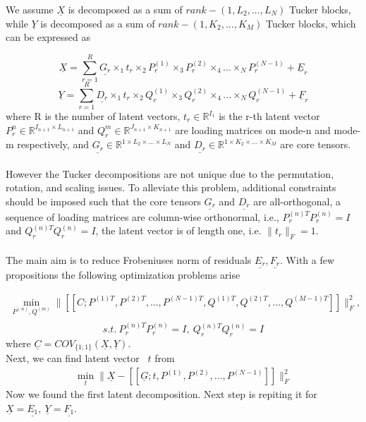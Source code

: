 \documentclass[../../main.tex]{subfiles}
\begin{document}
We assume $\underline{X}$ is decomposed as a sum of $rank-(1, L_2, . . . , L_N )$ Tucker blocks, while $\underline{Y}$ is decomposed as a sum of $rank-(1, K_2, . . . , K_M)$ Tucker blocks, which can be expressed as

$$\underline{X} = \sum_{r=1}^{R}\underline{G_r}\times_{1} t_r \times_{2} P^{(1)}_r \times_{3} P^{(2)}_r \times_{4} ...\times_{N} P^{(N-1)}_r + \underline{E}_r$$
$$\underline{Y} = \sum_{r=1}^{R}\underline{D_r}\times_{1} t_r \times_{2} Q^{(1)}_r \times_{3} Q^{(2)}_r \times_{4} ...\times_{N} Q^{(N-1)}_r + \underline{F}_r$$
where R is the number of latent vectors, $t_r \in \mathbb{R}^{I_1}$ is the r-th latent vector $P_r^{n} \in \mathbb{R}^{I_{n+1} \times L_{n+1}}$ and $Q_r^{m} \in \mathbb{R}^{J_{n+1} \times K_{n+1}}$ are loading matrices on mode-n and mode-m respectively, and $\underline{G_r} \in \mathbb{R}^{1 \times L_{2}\times ...\times L_{N}}$ and $\underline{D_r}\in \mathbb{R}^{1 \times K_{2}\times ...\times K_{M}}$ are core tensors.\\
\\
However the Tucker decompositions are not unique due to the permutation, rotation, and scaling issues. To alleviate this problem, additional constraints should be imposed such that the core tensors $\underline{G_r}$ and $\underline{D_r}$ are all-orthogonal, a sequence of loading matrices are column-wise orthonormal, i.e., $P^{(n)T}_rP^{(n)}_r = I$ and $Q^{(n)T}_rQ^{(n)}_r = I$, the latent vector is of length one, i.e. $\|t_r\|_F=1$.\\
\\
The main aim is to reduce Frobeniuses norm of residuals $\underline{E_r}, \underline{F_r}$. With a few propositions the following optimization problems arise

\[
\label{eq:example:2}
\begin{aligned}
   \min_{P^{(n)}, Q^{(m)}} \| [[C; P^{(1)T}, P^{(2)T}, ..., P^{(N-1)T}, Q^{(1)T}, Q^{(2)T}, ..., Q^{(M-1)T}]]\|_F^2,\\
\end{aligned}
\]
$$s.t. ~P^{(n)T}_rP^{(n)}_r = I, ~Q^{(n)T}_rQ^{(n)}_r = I$$
where $\underline{C} = COV_{\{1;1\}}(\underline{X}, \underline{Y})$.\\
Next, we can find latent vector ~$t$ from 
\[
\label{eq:example:2}
\begin{aligned}
    \min_{t}\| \underline{X} - [[\underline{G};t,P^{(1)},P^{(2)}, ...,P^{(N-1)}]]\|_F^2
\end{aligned}
\]
Now we found the first latent decomposition. Next step is repiting it for $\underline{X} = \underline{E_1}, ~\underline{Y} = \underline{F_1}$.
\end{document}
